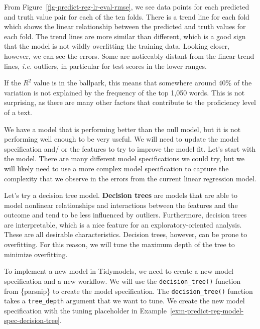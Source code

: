 \documentclass[
  letterpaper,
  krantz1]{latex/krantz-mod}
\theoremstyle{definition}
\theoremstyle{definition}
\theoremstyle{remark}
\begin{document}
From Figure~\ref{fig-predict-reg-lr-eval-rmse}, we see data points for
each predicted and truth value pair for each of the ten folds. There is
a trend line for each fold which shows the linear relationship between
the predicted and truth values for each fold. The trend lines are more
similar than different, which is a good sign that the model is not
wildly overfitting the training data. Looking closer,
however, we can see the errors. Some are noticeably distant from the
linear trend lines, \emph{i.e.} outliers, in particular for test scores
in the lower ranges.

If the \(R^2\) value is in the ballpark, this means
that somewhere around 40\% of the variation is not explained by the
frequency of the top 1,050 words. This is not surprising, as there are
many other factors that contribute to the proficiency level of a text.

We have a model that is performing better than the null
model, but it is not performing well enough to be very
useful. We will need to update the model specification and/ or the
features to try to improve the model fit. Let's start with the model.
There are many different model specifications we could try, but we will
likely need to use a more complex model specification to capture the
complexity that we observe in the errors from the current linear
regression model.

Let's try a decision tree model. \textbf{Decision
trees} are models that are able to model nonlinear
relationships and interactions between the features and the outcome and
tend to be less influenced by outliers. Furthermore, decision trees are
interpretable, which is a nice feature for an exploratory-oriented
analysis. These are all desirable
characteristics. Decision trees, however, can be prone to overfitting.
For this reason, we will tune the maximum depth of the
tree to minimize overfitting.

To implement a new model in Tidymodels, we need to create a new model
specification and a new workflow. We will use the
\texttt{decision\_tree()} function from \{parsnip\} to create the model
specification. The \texttt{decision\_tree()} function takes a
\texttt{tree\_depth} argument that we want to tune. We create the new
model specification with the tuning placeholder in
Example~\ref{exm-predict-reg-model-spec-decision-tree}.
\end{document}

